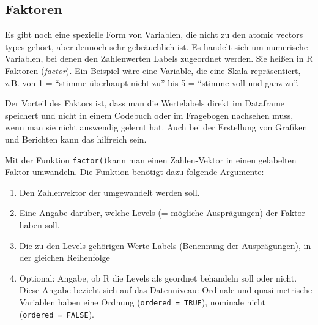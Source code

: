 \documentclass[
]{book}
\begin{document}
\hypertarget{faktoren}{%
\subsection{Faktoren}\label{faktoren}}

Es gibt noch eine spezielle Form von Variablen, die nicht zu den atomic vectors types gehört, aber dennoch sehr gebräuchlich ist. Es handelt sich um numerische Variablen, bei denen den Zahlenwerten Labels zugeordnet werden. Sie heißen in R Faktoren (\emph{factor}). Ein Beispiel wäre eine Variable, die eine Skala repräsentiert, z.B. von 1 = ``stimme überhaupt nicht zu'' bis 5 = ``stimme voll und ganz zu''.

Der Vorteil des Faktors ist, dass man die Wertelabels direkt im Dataframe speichert und nicht in einem Codebuch oder im Fragebogen nachsehen muss, wenn man sie nicht auswendig gelernt hat. Auch bei der Erstellung von Grafiken und Berichten kann das hilfreich sein.

Mit der Funktion \texttt{factor()}kann man einen Zahlen-Vektor in einen gelabelten Faktor umwandeln. Die Funktion benötigt dazu folgende Argumente:

\begin{enumerate}
\def\labelenumi{\arabic{enumi}.}
\item
  Den Zahlenvektor der umgewandelt werden soll.
\item
  Eine Angabe darüber, welche Levels (= mögliche Ausprägungen) der Faktor haben soll.
\item
  Die zu den Levels gehörigen Werte-Labels (Benennung der Ausprägungen), in der gleichen Reihenfolge
\item
  Optional: Angabe, ob R die Levels als geordnet behandeln soll oder nicht. Diese Angabe bezieht sich auf das Datenniveau: Ordinale und quasi-metrische Variablen haben eine Ordnung (\texttt{ordered\ =\ TRUE}), nominale nicht (\texttt{ordered\ =\ FALSE}).
\end{enumerate}
\end{document}
